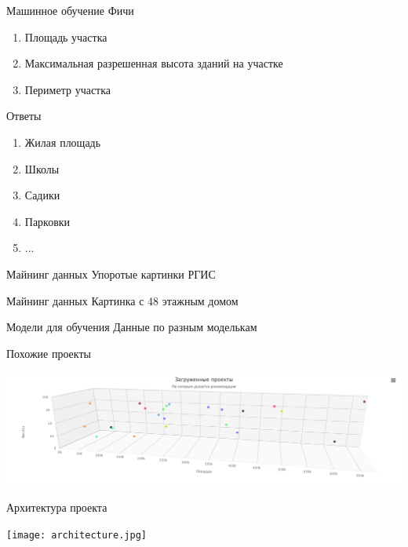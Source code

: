 \documentclass[14pt, fleqn, xcolor={dvipsnames, table}]{beamer}
\begin{document}
        \begin{frame}{Машинное обучение}
            Фичи
            \begin{enumerate}
               \item Площадь участка
               \item Максимальная разрешенная высота зданий на участке
               \item Периметр участка
            \end{enumerate}
            Ответы
            \begin{enumerate}
               \item Жилая площадь
               \item Школы
               \item Садики
               \item Парковки
               \item ...
            \end{enumerate}           
        \end{frame}
        
        \begin{frame}{Майнинг данных}
            Упоротые картинки РГИС    
        \end{frame}
        
        \begin{frame}{Майнинг данных}
            Картинка с 48 этажным домом
        \end{frame}
        
        \begin{frame}{Модели для обучения}
            Данные по разным моделькам
        \end{frame}
        
        \begin{frame}{Похожие проекты}
            \begin{center}
                \includegraphics[scale=0.25]{nn.png}
            \end{center}
        \end{frame}
        
        \begin{frame}{Архитектура проекта}
            \begin{center}
                \texttt{[image: architecture.jpg]}
            \end{center}
        \end{frame}
        
\end{document}
